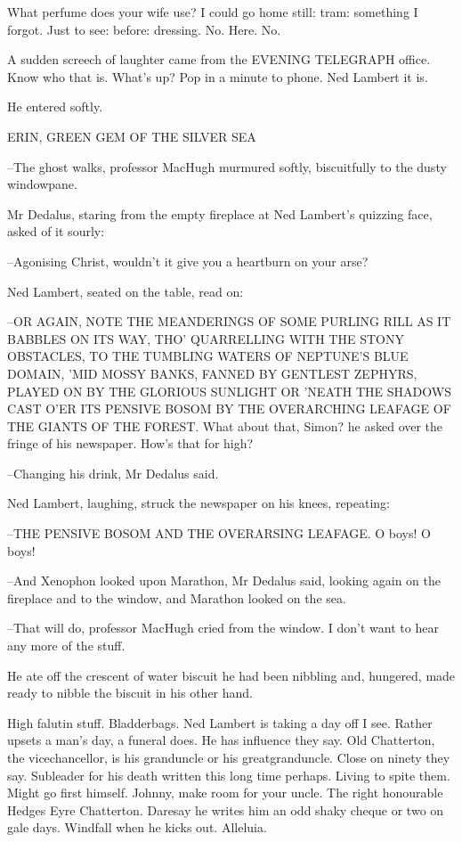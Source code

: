 What perfume does your wife use? I could go home still: tram:
something I forgot. Just to see: before: dressing. No. Here. No.

A sudden screech of laughter came from the EVENING TELEGRAPH office. Know
who that is. What's up? Pop in a minute to phone. Ned Lambert it is.

He entered softly.


    ERIN, GREEN GEM OF THE SILVER SEA


--The ghost walks, professor MacHugh murmured softly, biscuitfully to
the dusty windowpane.

Mr Dedalus, staring from the empty fireplace at Ned Lambert's
quizzing face, asked of it sourly:

--Agonising Christ, wouldn't it give you a heartburn on your arse?

Ned Lambert, seated on the table, read on:

--OR AGAIN, NOTE THE MEANDERINGS OF SOME PURLING RILL AS IT BABBLES ON
ITS WAY, THO' QUARRELLING WITH THE STONY OBSTACLES, TO THE TUMBLING WATERS
OF NEPTUNE'S BLUE DOMAIN, 'MID MOSSY BANKS, FANNED BY GENTLEST ZEPHYRS,
PLAYED ON BY THE GLORIOUS SUNLIGHT OR 'NEATH THE SHADOWS CAST O'ER ITS
PENSIVE BOSOM BY THE OVERARCHING LEAFAGE OF THE GIANTS OF THE FOREST. What
about that, Simon? he asked over the fringe of his newspaper. How's that
for high?

--Changing his drink, Mr Dedalus said.

Ned Lambert, laughing, struck the newspaper on his knees, repeating:

--THE PENSIVE BOSOM AND THE OVERARSING LEAFAGE. O boys! O boys!

--And Xenophon looked upon Marathon, Mr Dedalus said, looking again
on the fireplace and to the window, and Marathon looked on the sea.

--That will do, professor MacHugh cried from the window. I don't want to
hear any more of the stuff.

He ate off the crescent of water biscuit he had been nibbling and,
hungered, made ready to nibble the biscuit in his other hand.

High falutin stuff. Bladderbags. Ned Lambert is taking a day off I
see. Rather upsets a man's day, a funeral does. He has influence they say.
Old Chatterton, the vicechancellor, is his granduncle or his
greatgranduncle. Close on ninety they say. Subleader for his death written
this long time perhaps. Living to spite them. Might go first himself.
Johnny, make room for your uncle. The right honourable Hedges Eyre
Chatterton. Daresay he writes him an odd shaky cheque or two on gale days.
Windfall when he kicks out. Alleluia.

